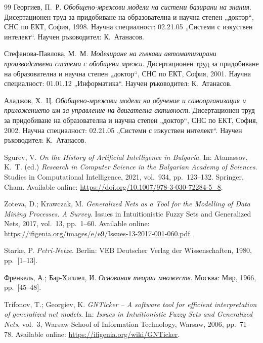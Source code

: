 \begin{thebibliography}{99}
Георгиев, П.~Р.
\newblock \emph{Обобщено-мрежови модели на системи базирани на знания}.
\newblock Дисертационен труд за придобиване на образователна и научна степен „доктор“,
СНС по ЕКТ, София, 1998.
\newblock Научна специалност: 02.21.05 „Системи с изкуствен интелект“.
\newblock Научен ръководител: К.~Атанасов.

Стефанова-Павлова, М.~М.
\newblock \emph{Моделиране на гъвкави автоматизирани производствени системи с обобщени мрежи}.
\newblock Дисертационен труд за придобиване на образователна и научна степен „доктор“,
СНС по ЕКТ, София, 2001.
\newblock Научна специалност: 01.01.12 „Информатика“.
\newblock Научен ръководител: К.~Атанасов.

Аладжов, Х.~Ц.
\newblock \emph{Обобщено-мрежови модели на обучение и самоорганизация и приложението им за управление на двигателна активност}.
\newblock Дисертационен труд за придобиване на образователна и научна степен „доктор“,
СНС по ЕКТ, София, 2002.
\newblock Научна специалност: 02.21.05 „Системи с изкуствен интелект“.
\newblock Научен ръководител: К.~Атанасов.

Sgurev, V.
\newblock \emph{On the History of Artificial Intelligence in Bulgaria}.
\newblock In: Atanassov, K.~T. (ed.) \emph{Research in Computer Science in the Bulgarian Academy of Sciences}. Studies in Computational Intelligence, 2021, vol.~934, pp.~123--132. Springer, Cham.
\newblock Available online: \url{https://doi.org/10.1007/978-3-030-72284-5_8}.

Zoteva, D.; Krawczak, M.
\newblock \emph{Generalized Nets as a Tool for the Modelling of Data Mining Processes. A Survey}.
\newblock Issues in Intuitionistic Fuzzy Sets and Generalized Nets, 2017, vol.~13, pp.~1--60.
\newblock Available online: \url{https://ifigenia.org/images/e/e9/Issues-13-2017-001-060.pdf}.

Starke, P.
\newblock \emph{Petri-Netze}.
\newblock Berlin: VEB Deutscher Verlag der Wissenschaften, 1980, pp.~[1--13].

Френкель, А.; Бар-Хиллел, И.
\newblock \emph{Основания теории множеств}.
\newblock Москва: Мир, 1966, pp.~[45--48].

Trifonov, T.; Georgiev, K.
\newblock \emph{GNTicker -- A software tool for efficient interpretation of generalized net models}.
\newblock In: \emph{Issues in Intuitionistic Fuzzy Sets and Generalized Nets}, vol.~3, Warsaw School of Information Technology, Warsaw, 2006, pp.~71--78.
\newblock Available online: \url{https://ifigenia.org/wiki/GNTicker}.


\end{thebibliography}
